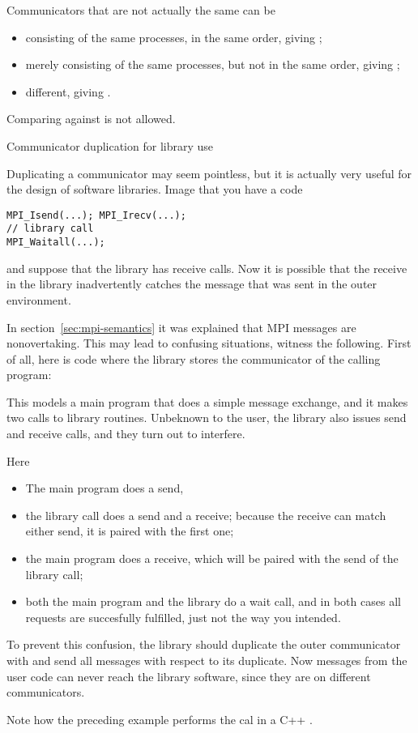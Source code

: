 Communicators that are not actually the same can be
\begin{itemize}
\item consisting of the same processes, in the same order,
  giving ;
\item merely consisting of the same processes, but not in the same order,
  giving ;
\item different, giving .
\end{itemize}

Comparing against  is not allowed.

 {Communicator duplication for library use}

Duplicating a communicator may seem pointless, but it is actually very useful for the design of
software libraries. Image that you have a code
\lstset{style=reviewcode,language=C}
\begin{lstlisting}
MPI_Isend(...); MPI_Irecv(...);
// library call
MPI_Waitall(...);
\end{lstlisting}
and suppose that the library has receive calls. Now it is possible that the 
receive in the library inadvertently
catches the message that was sent in the outer environment.

In section~\ref{sec:mpi-semantics} it was explained that MPI messages are 
nonovertaking. This may lead to confusing situations, witness the following.
First of all, here is code where the library stores the communicator
of the calling program:
%

This models a main program that does a simple message exchange, and it
makes two calls to library routines. Unbeknown to the user, the
library also issues send and receive calls, and they turn out to
interfere.

Here
\begin{itemize}
\item The main program does a send,
\item the library call  does a send and a receive;
  because the receive can match either send, it is paired with the
  first one;
\item the main program does a receive, which will be paired with the send of the 
  library call;
\item both the main program and the library do a wait call, and in
  both cases all requests are succesfully fulfilled, just not the way
  you intended.
\end{itemize}

To prevent this confusion, the library should duplicate the outer
communicator with 
%
and send all messages with respect to its duplicate. Now messages from the user
code can never reach the library software, since they are on different communicators.


Note how the preceding example
performs the 
cal in a C++ .



